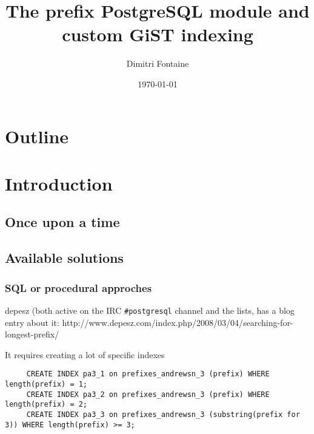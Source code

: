 \documentclass{beamer}
\title{The prefix PostgreSQL module and custom GiST indexing}
\author{Dimitri Fontaine}
\date{\today}
\begin{document}
\frame{\titlepage}

\section*{Outline}

\section{Introduction}
\subsection{Once upon a time}


\subsection{Available solutions}

\begin{frame}[fragile]
  \frametitle{SQL or procedural approches}
  
  depesz (both active on the IRC \texttt{\#postgresql} channel and the lists, has a blog entry
  about it: http://www.depesz.com/index.php/2008/03/04/searching-for-longest-prefix/
  
  It requires creating a lot of specific indexes
  
  \begin{example}
  \begin{verbatim}
     CREATE INDEX pa3_1 on prefixes_andrewsn_3 (prefix) WHERE length(prefix) = 1;
     CREATE INDEX pa3_2 on prefixes_andrewsn_3 (prefix) WHERE length(prefix) = 2;
     CREATE INDEX pa3_3 on prefixes_andrewsn_3 (substring(prefix for 3)) WHERE length(prefix) >= 3;
  \end{verbatim}
  \end{example}
\end{frame}
\end{document}
